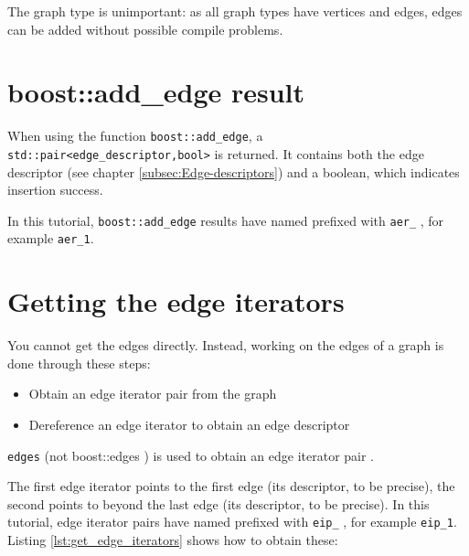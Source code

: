 The graph type is unimportant: as all graph types have vertices and edges,
 edges can be added without possible compile problems.

\section{boost::add\_edge result}
\label{subsec:boost_add_edge_result}

When using the function \verb;boost::add_edge;, 
a \verb;std::pair<edge_descriptor,bool>; is returned.
It contains both the edge descriptor 
(see chapter \ref{subsec:Edge-descriptors}) 
and a boolean, which indicates insertion success.

In this tutorial, \verb;boost::add_edge; results 
have named prefixed with \verb;aer_; ,
for example \verb;aer_1;.

\section{Getting the edge iterators}
\label{subsec:get_edge_iterators}

You cannot get the edges directly.
Instead, working on the edges of a graph is done through these steps:

\begin{itemize}
  \item Obtain an edge iterator pair from the graph
  \item Dereference an edge iterator to obtain an edge descriptor
\end{itemize}

\verb;edges;  
(not boost::edges )
is used to obtain an edge iterator pair
.

The first edge iterator 
points to the first edge (its descriptor, to be precise), the second points
to beyond the last edge (its descriptor, to be precise).
In this tutorial, 
edge iterator pairs have named prefixed with \verb;eip_; , 
for example \verb;eip_1;.
Listing \ref{lst:get_edge_iterators}
shows how to obtain these:

